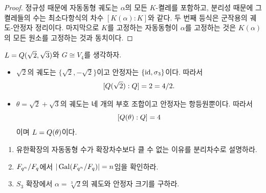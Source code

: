 \begin{proof}
정규성 때문에 자동동형 궤도는 $\alpha$의 모든 $K$-켤레를 포함하고, 분리성 때문에 그 켤레들의 수는 최소다항식의 차수 $[K(\alpha):K]$와 같다. 두 번째 등식은 군작용의 궤도-안정자 정리이다. 마지막으로 $K$를 고정하는 자동동형이 $\alpha$를 고정하는 것은 $K(\alpha)$의 모든 원소를 고정하는 것과 동치이다.
\end{proof}

\begin{example}
$L=Q(\sqrt2,\sqrt3)$와 $G\cong V_4$를 생각하자.
\begin{itemize}
  \item $\sqrt2$의 궤도는 $\{\sqrt2,-\sqrt2\}$이고 안정자는 $\{\operatorname{id},\sigma_3\}$이다. 따라서
  \[
    [Q(\sqrt2):Q]=2=4/2.
  \]
  \item $\theta=\sqrt2+\sqrt3$의 궤도는 네 개의 부호 조합이고 안정자는 항등원뿐이다. 따라서
  \[
    [Q(\theta):Q]=4
  \]
  이며 $L=Q(\theta)$이다.
\end{itemize}
\end{example}

\begin{checkpoint}
\begin{enumerate}[label=(\alph*)]
  \item 유한확장의 자동동형 수가 확장차수보다 클 수 없는 이유를 분리차수로 설명하라.
  \item $F_{q^n}/F_q$에서 $|\operatorname{Gal}(F_{q^n}/F_q)|=n$임을 확인하라.
  \item $S_3$ 확장에서 $\alpha=\sqrt[3]{2}$의 궤도와 안정자 크기를 구하라.
\end{enumerate}
\end{checkpoint}
